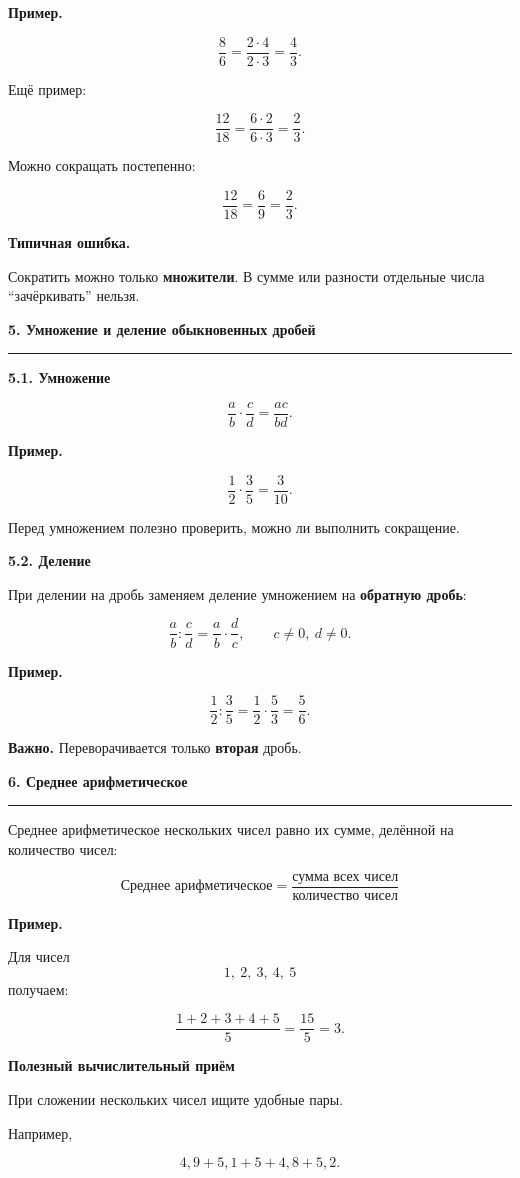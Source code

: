 \documentclass[a4paper,12pt]{article}
\newcommand{\topic}[1]{%
  \vspace{0.7em}
  {\Large\bfseries\color{darkaccent}#1}\par
  \vspace{0.25em}
  {\color{accent}\rule{\linewidth}{0.5pt}}
  \vspace{0.55em}
}
\newcommand{\subtopic}[1]{%
  \vspace{0.4em}
  {\large\bfseries\color{darkaccent}#1}\par
  \vspace{0.15em}
}
\newcommand{\important}[1]{%
  \par
  \vspace{0.25em}
  \noindent
  \textcolor{darkaccent}{\textbf{Важно.}} #1
  \par
}
\newcommand{\exampletitle}{%
  \par
  \vspace{0.3em}
  \noindent
  \textcolor{accent}{\textbf{Пример.}}\enspace
}
\newcommand{\mistaketitle}{%
  \par
  \vspace{0.3em}
  \noindent
  \textcolor{darkaccent}{\textbf{Типичная ошибка.}}\enspace
}
\begin{document}
\exampletitle

\[
\frac{8}{6}
=
\frac{2\cdot4}{2\cdot3}
=
\frac43.
\]

Ещё пример:

\[
\frac{12}{18}
=
\frac{6\cdot2}{6\cdot3}
=
\frac23.
\]

Можно сокращать постепенно:

\[
\frac{12}{18}
=
\frac69
=
\frac23.
\]

\mistaketitle
Сократить можно только \textbf{множители}.
В сумме или разности отдельные числа ``зачёркивать'' нельзя.

\topic{5. Умножение и деление обыкновенных дробей}

\subtopic{5.1. Умножение}

\[
\frac ab\cdot\frac cd
=
\frac{ac}{bd}.
\]

\exampletitle

\[
\frac12\cdot\frac35
=
\frac{3}{10}.
\]

Перед умножением полезно проверить, можно ли выполнить сокращение.

\subtopic{5.2. Деление}

При делении на дробь заменяем деление умножением на
\textbf{обратную дробь}:

\[
\frac ab:\frac cd
=
\frac ab\cdot\frac dc,
\qquad c\ne0,\ d\ne0.
\]

\exampletitle

\[
\frac12:\frac35
=
\frac12\cdot\frac53
=
\frac56.
\]

\important{
Переворачивается только \textbf{вторая} дробь.
}

\topic{6. Среднее арифметическое}

Среднее арифметическое нескольких чисел равно их сумме,
делённой на количество чисел:

\[
\boxed{
\text{Среднее арифметическое}
=
\frac{\text{сумма всех чисел}}
     {\text{количество чисел}}
}
\]

\exampletitle

Для чисел
\[
1,\ 2,\ 3,\ 4,\ 5
\]
получаем:

\[
\frac{1+2+3+4+5}{5}
=
\frac{15}{5}
=
3.
\]

\subtopic{Полезный вычислительный приём}

При сложении нескольких чисел ищите удобные пары.

Например,

\[
4{,}9+5{,}1+5+4{,}8+5{,}2.
\]
\end{document}
